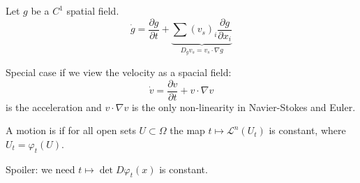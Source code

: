 \begin{theorem}\label{thm:1.16}
    Let \(g\) be a \(C^1\) spatial field.
    \[\dot{g}=\frac{\partial g}{\partial t}+\underbrace{\sum (v_s)_i\frac{\partial g}{\partial x_i}}_{D_g v_s = v_s\cdot \nabla g}\]
\end{theorem}

Special case if we view the velocity as a spacial field:
\[\dot{v}=\frac{\partial v}{\partial t}+v\cdot \nabla v\]
is the acceleration and \(v\cdot \nabla v\) is the only non-linearity in Navier-Stokes and Euler.

\begin{definition}\label{def:1.17}
    A motion is  if for all open sets \(U\subset \Omega\) the map 
    \(t\mapsto \mathcal{L}^n(U_t)\) is constant, where \(U_t=\varphi_t(U)\). 
\end{definition}


Spoiler: we need \(t\mapsto \det D\varphi_t(x)\) is constant.

